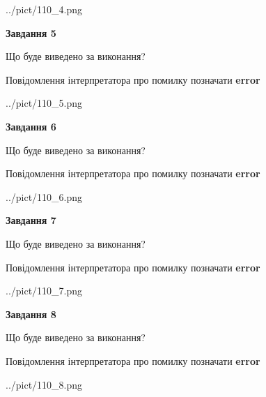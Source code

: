 \documentclass[12pt, ukrainian]{article}
\begin{document}
{\begin{center}
	{../pict/110_4.png}
\end{center}
\newpage

{\begin {center}\textbf{Завдання 5}\end {center}}\par
Що буде виведено за виконання? \par
Повідомлення інтерпретатора про помилку позначати \textbf{error}

\begin{center}
	{../pict/110_5.png}
\end{center}
\newpage

{\begin {center}\textbf{Завдання 6}\end {center}}\par
Що буде виведено за виконання? \par
Повідомлення інтерпретатора про помилку позначати \textbf{error}

\begin{center}
	{../pict/110_6.png}
\end{center}
\newpage

{\begin {center}\textbf{Завдання 7}\end {center}}\par
Що буде виведено за виконання? \par
Повідомлення інтерпретатора про помилку позначати \textbf{error}

\begin{center}
	{../pict/110_7.png}
\end{center}
\newpage

{\begin {center}\textbf{Завдання 8}\end {center}}\par
Що буде виведено за виконання? \par
Повідомлення інтерпретатора про помилку позначати \textbf{error}

\begin{center}
	{../pict/110_8.png}
\end{center}
\newpage

}
\end{document}
